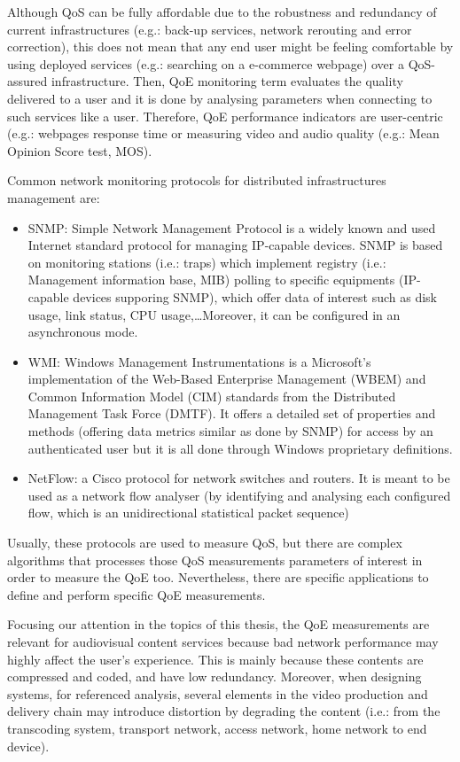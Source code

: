 Although QoS can be fully affordable due to the robustness and redundancy of current infrastructures (e.g.: back-up services, network rerouting and error correction), this does not mean that any end user might be feeling comfortable by using deployed services (e.g.: searching on a e-commerce webpage) over a QoS-assured infrastructure. Then, QoE monitoring term evaluates the quality delivered to a user and it is done by analysing parameters when connecting to such services like a user. Therefore, QoE performance indicators are user-centric (e.g.: webpages response time or measuring video and audio quality (e.g.: Mean Opinion Score test, MOS).

Common network monitoring protocols for distributed infrastructures management are:

\begin{itemize}
\item SNMP: Simple Network Management Protocol is a widely known and used Internet standard protocol for managing IP-capable devices. SNMP is based on monitoring stations (i.e.: traps) which implement registry (i.e.: Management information base, MIB) polling to specific equipments (IP-capable devices supporing SNMP), which offer data of interest such as disk usage, link status, CPU usage,\ldots Moreover, it can be configured in an asynchronous mode.
\item WMI: Windows Management Instrumentations is a Microsoft's implementation of the Web-Based Enterprise Management (WBEM) and Common Information Model (CIM) standards from the Distributed Management Task Force (DMTF). It offers a detailed set of properties and methods (offering data metrics similar as done by SNMP) for access by an authenticated user but it is all done through Windows proprietary definitions.
\item NetFlow: a Cisco protocol for network switches and routers. It is meant to be used as a network flow analyser (by identifying and analysing each configured flow, which is an unidirectional statistical packet sequence) 
\end{itemize}  

Usually, these protocols are used to measure QoS, but there are complex algorithms that processes those QoS measurements parameters of interest in order to measure the QoE too. Nevertheless, there are specific applications to define and perform specific QoE measurements. 

Focusing our attention in the topics of this thesis, the QoE measurements are relevant for audiovisual content services because bad network performance may highly affect the user's experience. This is mainly because these contents are compressed and coded, and have low redundancy. Moreover, when designing systems, for referenced analysis, several elements in the video production and delivery chain may introduce distortion by degrading the content (i.e.: from the transcoding system, transport network, access network, home network to end device).

